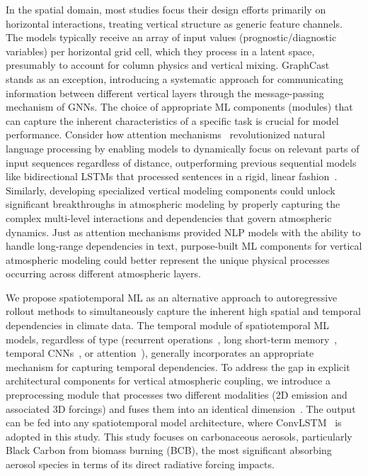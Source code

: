 \documentclass{article}
\begin{document}
    In the spatial domain, most studies focus their design efforts primarily on horizontal interactions, treating vertical structure as generic feature channels. The models typically receive an array of input values (prognostic/diagnostic variables) per horizontal grid cell, which they process in a latent space, presumably to account for column physics and vertical mixing. GraphCast~\cite{lam2023learning} stands as an exception, introducing a systematic approach for communicating information between different vertical layers through the message-passing mechanism of GNNs.
    The choice of appropriate ML components (modules) that can capture the inherent characteristics of a specific task is crucial for model performance. Consider how attention mechanisms~\cite{vaswani2017attention} revolutionized natural language processing by enabling models to dynamically focus on relevant parts of input sequences regardless of distance, outperforming previous sequential models like bidirectional LSTMs that processed sentences in a rigid, linear fashion~\cite{peters2018deep}. Similarly, developing specialized vertical modeling components could unlock significant breakthroughs in atmospheric modeling by properly capturing the complex multi-level interactions and dependencies that govern atmospheric dynamics. Just as attention mechanisms provided NLP models with the ability to handle long-range dependencies in text, purpose-built ML components for vertical atmospheric modeling could better represent the unique physical processes occurring across different atmospheric layers.

    We propose spatiotemporal ML as an alternative approach to autoregressive rollout methods to simultaneously capture the inherent high spatial and temporal dependencies in climate data. The temporal module of spatiotemporal ML models, regardless of type (recurrent operations~\cite{elman1990finding}, long short-term memory~\cite{graves2012long}, temporal CNNs~\cite{bai2018empirical}, or attention~\cite{vaswani2017attention}), generally incorporates an appropriate mechanism for capturing temporal dependencies. To address the gap in explicit architectural components for vertical atmospheric coupling, we introduce a preprocessing module that processes two different modalities (2D emission and associated 3D forcings) and fuses them into an identical dimension~\cite{tan2023temporal, wang2018recovering}. The output can be fed into any spatiotemporal model architecture, where ConvLSTM~\cite{shi2015convolutional} is adopted in this study. This study focuses on carbonaceous aerosols, particularly Black Carbon from biomass burning (BCB), the most significant absorbing aerosol species in terms of its direct radiative forcing impacts.
    
\end{document}
